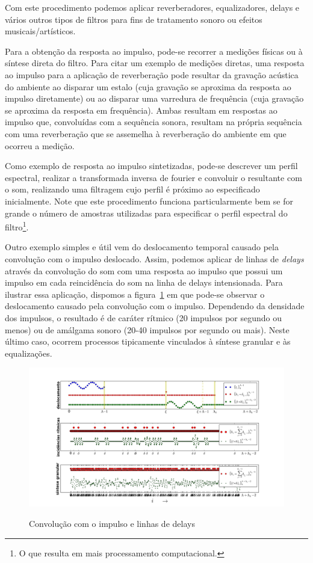 \begin{itemize}
Com este procedimento podemos aplicar reverberadores, equalizadores, delays
e vários outros tipos de filtros para fins de tratamento sonoro ou
efeitos musicais/artísticos.
 
Para a obtenção da resposta ao impulso, pode-se recorrer a medições
físicas ou à síntese direta do filtro. Para citar um exemplo
de medições diretas, uma resposta ao impulso para a aplicação
de reverberação pode resultar da gravação acústica do ambiente ao disparar
um estalo (cuja gravação se aproxima da resposta ao impulso diretamente) ou ao disparar uma
varredura de frequência (cuja gravação se aproxima da resposta em frequência).
Ambas resultam em respostas ao impulso
que, convoluídas com a sequência sonora, resultam na própria sequência
com uma reverberação que se assemelha à reverberação do ambiente 
em que ocorreu a medição.

Como exemplo de resposta ao impulso sintetizadas, pode-se
descrever um perfil espectral, realizar a transformada inversa
de fourier e convoluir o resultante com o som, realizando
uma filtragem cujo perfil é próximo ao especificado inicialmente. Note que este procedimento funciona particularmente bem se for grande o número de amostras utilizadas para especificar o perfil espectral do filtro\footnote{O que resulta em mais processamento computacional.}.

Outro exemplo simples e útil vem do deslocamento temporal causado pela convolução com o impulso deslocado. Assim, podemos aplicar de linhas de \emph{delays} através
da convolução do som com uma resposta ao impulso que possui um impulso
em cada reincidência do som na linha de delays intensionada.
Para ilustrar essa aplicação, dispomos a figura~\ref{fig:delays}
em que pode-se observar o deslocamento causado pela convolução
com o impulso. Dependendo da densidade dos impulsos, o resultado
é de caráter rítmico (20 impulsos por segundo ou menos) ou de amálgama
sonoro (20-40 impulsos por segundo ou mais). Neste último caso,
ocorrem processos tipicamente vinculados à síntese granular e às
equalizações.

\begin{figure}[h!]
    \centering
    \caption{Convolução com o impulso e linhas de delays}
        \includegraphics[width=\textwidth]{figuras/delays__}
        \label{fig:delays}
\end{figure}



\end{itemize}

